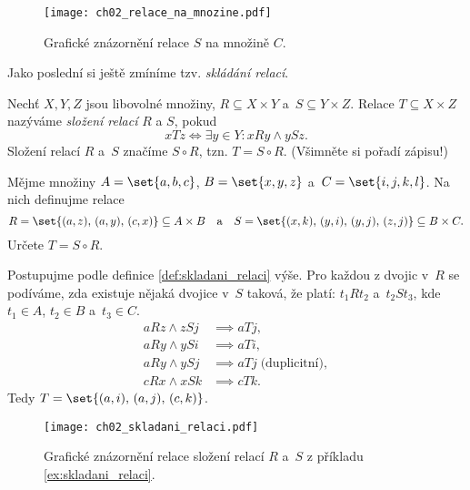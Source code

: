 \begin{figure}[H]
    \centering
    \texttt{[image: ch02\_relace\_na\_mnozine.pdf]}
    \caption{Grafické znázornění relace $S$ na množině $C$.}
    \label{fig:relace_na_mnozine}
\end{figure}
Jako poslední si ještě zmíníme tzv. \emph{skládání relací}.
\begin{definition}\label{def:skladani_relaci}
    Nechť $X,Y,Z$ jsou libovolné množiny, $R\subseteq X\times Y$ a~$S\subseteq Y\times Z$. Relace $T\subseteq X\times Z$ nazýváme \emph{složení relací} $R$ a $S$, pokud
    \begin{equation*}
        xTz \iff \exists y\in Y : xRy \land ySz.
    \end{equation*}
    Složení relací $R$ a~$S$ značíme $S\circ R$, tzn. $T=S\circ R$. (Všimněte si pořadí zápisu!)
\end{definition}
\begin{example}\label{ex:skladani_relaci}
    Mějme množiny $A=\set{a,b,c}$, $B=\set{x,y,z}$ a~$C=\set{i,j,k,l}$. Na nich definujme relace
    \begin{equation*}
        R=\set{(a,z),\,(a,y),\,(c,x)}\subseteq A\times B\quad\text{a}\quad S=\set{(x,k),\,(y,i),\,(y,j),\,(z,j)}\subseteq B\times C.
    \end{equation*}
    Určete $T=S\circ R$.
\end{example}
\begin{solution}
    Postupujme podle definice \ref{def:skladani_relaci} výše. Pro každou z dvojic v~$R$ se podíváme, zda existuje nějaká dvojice v~$S$ taková, že platí: $t_1Rt_2$ a~$t_2St_3$, kde $t_1\in A$, $t_2\in B$ a~$t_3\in C$.
    \begin{align*}
        aRz \land zSj &\implies aTj,\\
        aRy \land ySi &\implies aTi,\\
        aRy \land ySj &\implies aTj\;\text{(duplicitní)},\\
        cRx \land xSk &\implies cTk.
    \end{align*}
    Tedy $T=\set{(a,i),\,(a,j),\,(c,k)}$.
\end{solution}
\begin{figure}[H]
    \centering
    \texttt{[image: ch02\_skladani\_relaci.pdf]}
    \caption{Grafické znázornění relace složení relací $R$ a~$S$ z příkladu \ref{ex:skladani_relaci}.}
    \label{fig:skladani_relaci}
\end{figure}

